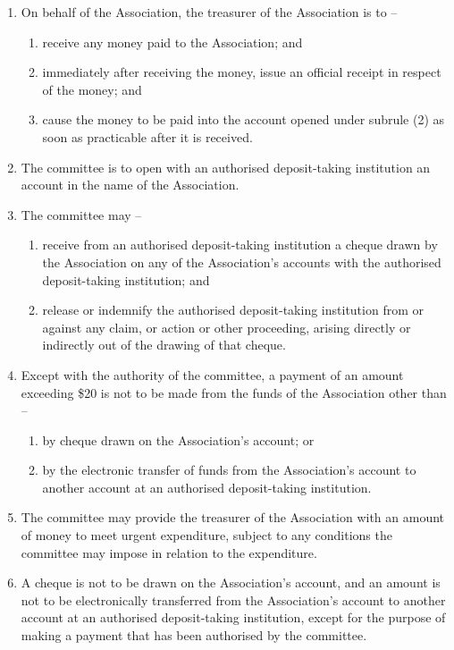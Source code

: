 \documentclass[a4paper,11pt]{article}
\begin{document}
\begin{enumerate}
	\item On behalf of the Association, the treasurer of the Association is to --
	\begin{enumerate}
		\item receive any money paid to the Association; and
		\item immediately after receiving the money, issue an official receipt in respect of the money; and
		\item cause the money to be paid into the account opened under subrule (2) as soon as practicable after it is received.
	\end{enumerate}
	
	\item The committee is to open with an authorised deposit-taking institution an account in the name of the Association.
	
	\item The committee may --
	\begin{enumerate}
		\item receive from an authorised deposit-taking institution a cheque drawn by the Association on any of the Association's accounts with the authorised deposit-taking institution; and
		\item release or indemnify the authorised deposit-taking institution from or against any claim, or action or other proceeding, arising directly or indirectly out of the drawing of that cheque.
	\end{enumerate}
	
	\item Except with the authority of the committee, a payment of an amount exceeding \$20 is not to be made from the funds of the Association other than --
	\begin{enumerate}
		\item by cheque drawn on the Association's account; or
		\item by the electronic transfer of funds from the Association's account to another account at an authorised deposit-taking institution.
	\end{enumerate}
	
	\item The committee may provide the treasurer of the Association with an amount of money to meet urgent expenditure, subject to any conditions the committee may impose in relation to the expenditure.
	\item A cheque is not to be drawn on the Association's account, and an amount is not to be electronically transferred from the Association's account to another account at an authorised deposit-taking institution, except for the purpose of making a payment that has been authorised by the committee.


\end{enumerate}
\end{document}
